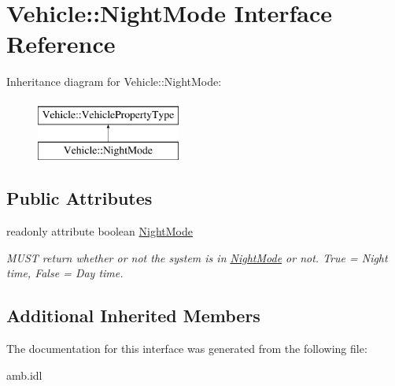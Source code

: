 \hypertarget{interfaceVehicle_1_1NightMode}{\section{Vehicle\-:\-:Night\-Mode Interface Reference}
\label{interfaceVehicle_1_1NightMode}
}
Inheritance diagram for Vehicle\-:\-:Night\-Mode\-:\begin{figure}[H]
\begin{center}
\leavevmode
\includegraphics[height=2.000000cm]{interfaceVehicle_1_1NightMode}
\end{center}
\end{figure}
\subsection*{Public Attributes}
\begin{DoxyCompactItemize}
\item 
\hypertarget{interfaceVehicle_1_1NightMode_a424ccee52e055e70d72dd20eccb2933d}{readonly attribute boolean \hyperlink{interfaceVehicle_1_1NightMode_a424ccee52e055e70d72dd20eccb2933d}{Night\-Mode}}\label{interfaceVehicle_1_1NightMode_a424ccee52e055e70d72dd20eccb2933d}

\begin{DoxyCompactList}\small\item\em M\-U\-S\-T return whether or not the system is in \hyperlink{interfaceVehicle_1_1NightMode}{Night\-Mode} or not. True = Night time, False = Day time. \end{DoxyCompactList}\end{DoxyCompactItemize}
\subsection*{Additional Inherited Members}


The documentation for this interface was generated from the following file\-:\begin{DoxyCompactItemize}
\item 
amb.\-idl\end{DoxyCompactItemize}
